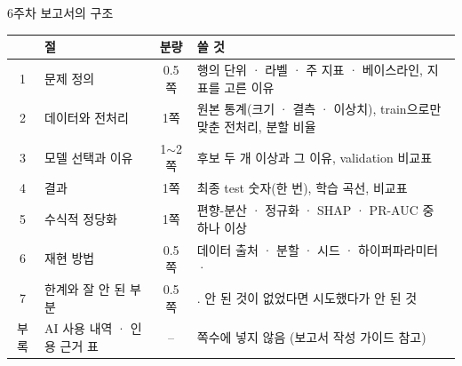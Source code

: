 \documentclass[aspectratio=169,11pt,t]{beamer}
\makeatletter
\newcommand{\markpage}[1]{\protected@write\@auxout{}{\string\newlabel{#1}{{\the\c@framenumber}{}}}\hypertarget{#1}{}}
\makeatother
\begin{document}
\begin{frame}{6주차 보고서의 구조}
\markpage{report}
\vfill
\centering\small
\renewcommand{\arraystretch}{1.12}
\begin{tabular}{cL{3.6cm}cL{7.4cm}}
\toprule
& \textbf{절} & \textbf{분량} & \textbf{쓸 것} \\
 & 문제 정의 & 0.5쪽 & 행의 단위 · 라벨 · 주 지표 · 베이스라인, 지표를 고른 이유 \\
2 & 데이터와 전처리 & 1쪽 & 원본 통계(크기 · 결측 · 이상치), train으로만 맞춘 전처리, 분할 비율 \\
3 & 모델 선택과 이유 & 1$\sim$2쪽 & 후보 두 개 이상과 그 이유, validation 비교표 \\
4 & 결과 & 1쪽 & 최종 test 숫자(한 번), 학습 곡선, 비교표 \\
5 & 수식적 정당화 & 1쪽 & 편향-분산 · 정규화 · SHAP · PR-AUC 중 하나 이상 \\
6 & 재현 방법 & 0.5쪽 & 데이터 출처 · 분할 · 시드 · 하이퍼파라미터 ·  \\
7 & 한계와 잘 안 된 부분 & 0.5쪽 & . 안 된 것이 없었다면 시도했다가 안 된 것 \\
부록 & AI 사용 내역 · 인용 근거 표 & -- & 쪽수에 넣지 않음 (보고서 작성 가이드 참고) \\
\bottomrule
\end{tabular}
\vfill
{}
\end{frame}
\end{document}
